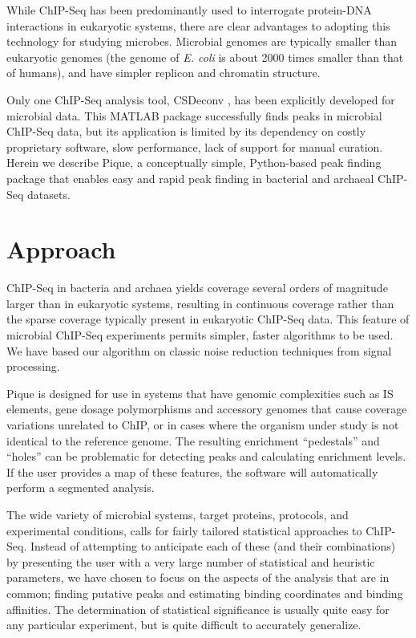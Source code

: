 \documentclass{bioinfo}
\begin{document}
While ChIP-Seq has been predominantly used to interrogate protein-DNA
interactions in eukaryotic systems, there are clear advantages to
adopting this technology for studying microbes. Microbial genomes are
typically smaller than eukaryotic genomes (the genome of {\em E. coli}
is about 2000 times smaller than that of humans), and have simpler
replicon and chromatin structure.

Only one ChIP-Seq analysis tool, CSDeconv \cite{CSDeconv}, has been
explicitly developed for microbial data. This MATLAB package
successfully finds peaks in microbial ChIP-Seq data, but its
application is limited by its dependency on costly proprietary
software, slow performance, lack of support for manual
curation. Herein we describe Pique, a conceptually simple,
Python-based peak finding package that enables easy and rapid peak
finding in bacterial and archaeal ChIP-Seq datasets.

\section{Approach}

\noindent ChIP-Seq in bacteria and archaea yields coverage several
orders of magnitude larger than in eukaryotic systems, resulting in
continuous coverage rather than the sparse coverage typically present
in eukaryotic ChIP-Seq data.  This feature of microbial ChIP-Seq
experiments permits simpler, faster algorithms to be used. We have
based our algorithm on classic noise reduction techniques from signal
processing.

Pique is designed for use in systems that have genomic complexities
such as IS elements, gene dosage polymorphisms and accessory genomes
that cause coverage variations unrelated to ChIP, or in cases where
the organism under study is not identical to the reference genome. The
resulting enrichment ``pedestals'' and ``holes'' can be problematic
for detecting peaks and calculating enrichment levels. If the user
provides a map of these features, the software will automatically
perform a segmented analysis.

The wide variety of microbial systems, target proteins, protocols, and
experimental conditions, calls for fairly tailored statistical
approaches to ChIP-Seq. Instead of attempting to anticipate each of
these (and their combinations) by presenting the user with a very
large number of statistical and heuristic parameters, we have chosen
to focus on the aspects of the analysis that are in common; finding
putative peaks and estimating binding coordinates and binding
affinities. The determination of statistical significance is usually
quite easy for any particular experiment, but is quite difficult to
accurately generalize.
\end{document}
